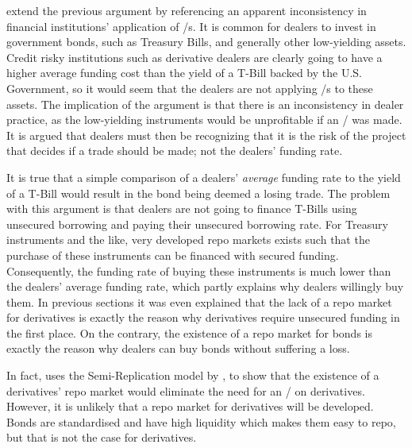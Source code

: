 \documentclass[main.tex]{subfiles}
\begin{document}
            \textcite{HullWhite2012FVA} extend the previous argument by referencing 
            an apparent inconsistency in financial institutions' application of \FVA/s.
            It is common for dealers to invest in government bonds, such as Treasury Bills,
            and generally other low-yielding assets.
            Credit risky institutions such as derivative dealers are clearly going to have
            a higher average funding cost than the yield of a T-Bill backed by the U.S. Government,
            so it would seem that the dealers are not applying \FVA/s to these assets.
            The implication of the argument is that there is an inconsistency in dealer practice,
            as the low-yielding instruments would be unprofitable if an \FVA/ was made.
            It is argued that dealers must then be recognizing that it is 
            the risk of the project that decides if a trade should be made; 
            not the dealers' funding rate.

            It is true that a simple comparison of a dealers' \textit{average} funding rate
            to the yield of a T-Bill would result in the bond being deemed a losing trade.
            The problem with this argument is that dealers are not going to finance T-Bills
            using unsecured borrowing and paying their unsecured borrowing rate.
            For Treasury instruments and the like,
            very developed repo markets exists such that 
            the purchase of these instruments can be financed with secured funding.
            Consequently, the funding rate of buying these instruments is much lower 
            than the dealers' average funding rate,
            which partly explains why dealers willingly buy them.
            In previous sections it was even explained that
            the lack of a repo market for derivatives is exactly the reason 
            why derivatives require unsecured funding in the first place.
            On the contrary, the existence of a repo market for bonds is exactly the reason
            why dealers can buy bonds without suffering a loss.

            In fact, \textcite[Section~9.4.1]{Green2015XVA}
            uses the Semi-Replication model by \textcite{BurgardKjaer2013Funding},
            to show that the existence of a derivatives' repo market
            would eliminate the need for an \FVA/ on derivatives. 
            However, it is unlikely that a repo market for derivatives will be developed.
            Bonds are standardised and have high liquidity which makes them easy to repo,
            but that is not the case for derivatives.
\end{document}
